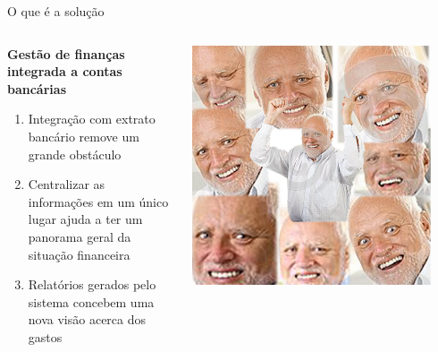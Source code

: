 \documentclass[12pt]{beamer}
\begin{document}
\begin{frame}{O que é a solução}
    \begin{columns}
        \begin{column}{0.65\textwidth}
        \textbf{Gestão de finanças integrada a contas bancárias}
        
            \begin{enumerate}[label=•]
                \item Integração com extrato bancário remove um grande obstáculo
    	        \item Centralizar as informações em um único lugar ajuda a ter um panorama geral da situação financeira
    	        \item Relatórios gerados pelo sistema concebem uma nova visão acerca dos gastos
            \end{enumerate}
        \end{column}
        \begin{column}{0.35\textwidth}
            \begin{center}
                \includegraphics[width=0.9\textwidth]{figuras/haroldsfelizes.jpg}
             \end{center}
        \end{column}
    \end{columns}
\end{frame}
\end{document}
